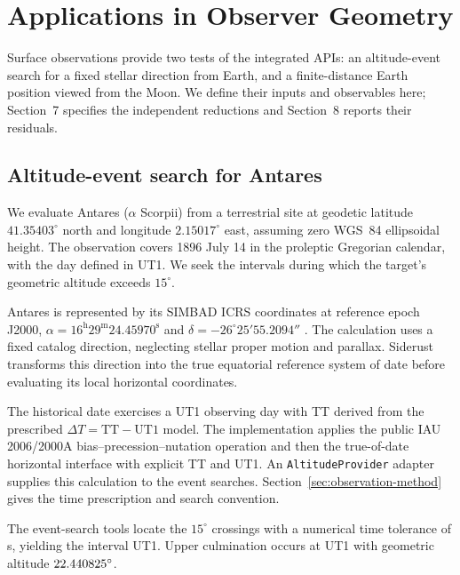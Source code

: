 \section{Applications in Observer Geometry}
\label{sec:application}

Surface observations provide two tests of the integrated APIs: an altitude-event search for a fixed
stellar direction from Earth, and a finite-distance Earth position viewed from the Moon. We define
their inputs and observables here; Section~7 specifies the independent reductions and Section~8
reports their residuals.

\subsection{Altitude-event search for Antares}
\label{sec:antares-example}

We evaluate Antares ($\alpha$ Scorpii) from a terrestrial site at geodetic latitude
$41.35403^\circ$ north and longitude $2.15017^\circ$ east, assuming zero WGS~84 ellipsoidal height.
The observation covers 1896 July 14 in the proleptic Gregorian calendar, with the day defined in
UT1. We seek the intervals during which the target's geometric altitude exceeds $15^\circ$.

Antares is represented by its SIMBAD ICRS coordinates at reference epoch J2000, $\alpha=16^{\mathrm
            h}29^{\mathrm m}24.45970^{\mathrm s}$ and $\delta=-26^\circ25'55.2094''$ \cite{simbadAntares}. The
calculation uses a fixed catalog direction, neglecting stellar proper motion and parallax. Siderust
transforms this direction into the true equatorial reference system of date before evaluating its
local horizontal coordinates.

The historical date exercises a UT1 observing day with TT derived from the prescribed $\Delta
    T=\mathrm{TT}-\mathrm{UT1}$ model. The implementation applies the public IAU 2006/2000A
bias--precession--nutation operation and then the true-of-date horizontal interface with explicit
TT and UT1. An \texttt{AltitudeProvider} adapter supplies this calculation to the event searches.
Section~\ref{sec:observation-method} gives the time prescription and search convention.

The event-search tools locate the $15^\circ$ crossings with a numerical time tolerance of
\ViewingEventTolerance{} s, yielding the interval \ViewingRefinedSpans{} UT1. Upper culmination
occurs at \ViewingCulminationTime{} UT1 with geometric altitude
$22.440825^\circ$.

